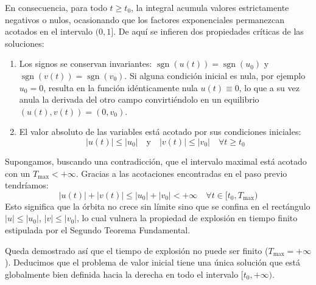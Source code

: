 {    En consecuencia, para todo $t \ge t_0$, la integral acumula valores estrictamente negativos o nulos, ocasionando que los factores exponenciales permanezcan acotados en el intervalo $(0, 1]$.
    De aquí se infieren dos propiedades críticas de las soluciones:
    \begin{enumerate}
        \item[1)] Los signos se conservan invariantes: $\operatorname{sgn}(u(t)) = \operatorname{sgn}(u_0)$ y $\operatorname{sgn}(v(t)) = \operatorname{sgn}(v_0)$. Si alguna condición inicial es nula, por ejemplo $u_0 = 0$, resulta en la función idénticamente nula $u(t) \equiv 0$, lo que a su vez anula la derivada del otro campo convirtiéndolo en un equilibrio $(u(t),v(t)) = (0, v_0)$.
        \item[2)] El valor absoluto de las variables está acotado por sus condiciones iniciales:
        \[
            |u(t)| \le |u_0| \quad \text{y} \quad |v(t)| \le |v_0| \quad \forall t \ge t_0
        \]
    \end{enumerate}

    Supongamos, buscando una contradicción, que el intervalo maximal está acotado con un $T_{\max} < +\infty$. Gracias a las acotaciones encontradas en el paso previo tendríamos:
    \[
        |u(t)| + |v(t)| \le |u_0| + |v_0| < +\infty \quad \forall t \in [t_0, T_{\max})
    \]
    Esto significa que la órbita no crece sin límite sino que se confina en el rectángulo $|u| \le |u_0|$, $|v| \le |v_0|$, lo cual vulnera la propiedad de explosión en tiempo finito estipulada por el Segundo Teorema Fundamental. 
    
    Queda demostrado así que el tiempo de explosión no puede ser finito ($T_{\max} = +\infty$). Deducimos que el problema de valor inicial tiene una única solución que está globalmente bien definida hacia la derecha en todo el intervalo $[t_0, +\infty)$.
}

